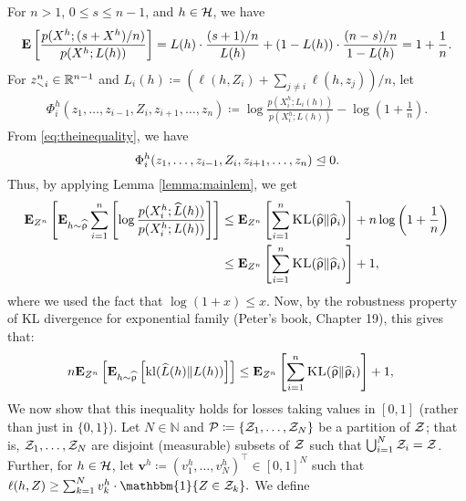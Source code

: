 \documentclass{article}
\makeatletter
\newcommand{\hro}{\what{\uprho}}
\renewenvironment{proof}[1][\proofname]{\par
	\pushQED{\qed}%
	\normalfont \topsep6\p@\@plus6\p@\relax
	\trivlist
	\item[%
	\hskip\labelsep
	\normalfont\bfseries %
	#1%
	]\ignorespaces
}{%
	\popQED\endtrivlist\@endpefalse
}
\let\qed\relax %
\DeclareRobustCommand{\qed}{%
	\ifmmode \mathqed
	\else
	\leavevmode\unskip\penalty\@M\hbox{}\nobreak\hfill%
	\hbox{\qedsymbol}%
	\fi
}
\makeatother
\begin{document}
\begin{proof}
For $n >1$, $0 \leq s \leq n-1$, and $h \in \mathcal H$, we have
\begin{align}{\bf E} \left[\frac{p(X^h; (s+X^h)/n)}{p(X^h; L(h))} \right]
= L(h) \cdot \frac{(s+1)/n}{L(h)} + 
(1- L(h)) \cdot \frac{(n-s)/n}{1-L(h)} = 1 + \frac{1}{n}. \label{eq:theinequality}
\end{align}
For $z^{n}_{\smallsetminus i} \in {\mathbb R}^{n-1}$ and $L_i(h)\coloneqq  (\ell(h, Z_i) + \sum_{j \neq i} \ell(h, z_j))/n$, let
\begin{align}
\Phi^h_{i}(z_1,\dots,z_{i-1}, Z_i, z_{i+1}, \dots, z_n) \coloneqq \log \frac{p(X^h_{i}; L_i(h) )}{p(X^h_{i}; L(h))} - \log \left(1 + \frac{1}{n} \right).
\end{align}
From \eqref{eq:theinequality}, we have
$$
\Phi^h_{i}(z_1,\dots,z_{i-1}, Z_i, z_{i+1}, \dots, z_n) \trianglelefteq  0.
$$
Thus, by applying Lemma \ref{lemma:mainlem}, we get
\begin{align*}
\E_{Z^n}\left[ \E_{h \sim \hro} \sum_{i=1}^n \left[\log \frac{p(X^h_{i}; \what{L}(h))}{p(X^h_{i}; L(h))} \right] \right]& \leq  \E_{Z^n} \left[
\sum_{i=1}^n \KL(\hro \| \hro_{i}) \right]+ n \log \left(1 + \frac{1}{n} \right) \\
&
\leq \E_{Z^n} \left[
\sum_{i=1}^n \KL(\hro \| \hro_{i}) \right]+ 1,
\end{align*}
where we used the fact that $\log (1 +x) \leq x$.
Now, by the robustness property of KL divergence for exponential family (Peter's book, Chapter 19), this gives that:
\begin{align}
n  \E_{Z^n} \left[\E_{h \sim \hro} \left[ \kl(\what{L}(h) \| L(h))\right] \right] &\leq 
\E_{Z^n} \left[
\sum_{i=1}^n \KL(\hro \| \hro_{i}) \right]+ 1, \label{eq:thebefore}
\end{align}
We now show that this inequality holds for losses taking values in $[0,1]$ (rather than just in $\{0,1\}$). Let $N \in \mathbb{N}$ and $\mathcal P \coloneqq \{\mathcal Z_1, \dots, \mathcal Z_N\}$ be a partition of $\mathcal Z$; that is, $\mathcal Z_1, \dots, \mathcal Z_N$ are disjoint (measurable) subsets of $\mathcal Z$ such that $\bigcup_{i=1}^N \mathcal Z_i = \mathcal Z$. Further, for $h\in \mathcal H$, let $\bm{v}^h \coloneqq (v^h_1, \dots, v^h_N)^{\top} \in [0,1]^N$ such that $\ell(h, Z)\geq    \sum_{k=1}^N v^h_k \cdot \mathbbm{1}\{Z \in \cZ_k \}.$ We define

\end{proof}
\end{document}
